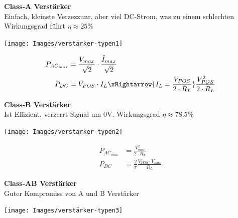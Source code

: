 \textbf{Class-A Verstärker}\\
Einfach, kleinste Verzezzunr, aber viel DC-Strom, was zu einem schlechten Wirkungsgrad führt $\eta \approx 25\%$ \\
\begin{minipage}{0.20\textwidth}
	\texttt{[image: Images/verstärker-typen1]}
\end{minipage}%
\begin{minipage}{0.30\textwidth}
	\begin{align*}
		P_{AC_{max}} &= \frac{V_{max}}{\sqrt{2}}\cdot \frac{\hat{I}_{max}}{\sqrt{2}} \\
		P_{DC} &= V_{POS} \cdot I_L \xRightarrow{I_L = \frac{V_{POS}}{2\cdot R_L}} \frac{V_{POS}^2}{2\cdot R_L}
	\end{align*}
\end{minipage}

\textbf{Class-B Verstärker}\\
Ist Effizient, verzerrt Signal um 0V. Wirkungsgrad $\eta \approx 78.5\%$\\
\begin{minipage}{0.20\textwidth}
	\texttt{[image: Images/verstärker-typen2]}
\end{minipage}%
\begin{minipage}{0.30\textwidth}
	\begin{align*}
		P_{AC_{max}} &= \frac{V_{max}^2}{2 \cdot R_L} \\
		P_{DC} &= \frac{2}{\pi}\frac{V_{POS}\cdot V_{max}}{R_L}
	\end{align*}
\end{minipage}

\textbf{Class-AB Verstärker}\\
Guter Kompromiss von A und B Verstärker\\
\begin{minipage}{0.20\textwidth}
	\texttt{[image: Images/verstärker-typen3]}
\end{minipage}%
\begin{minipage}{0.30\textwidth}
\end{minipage}

